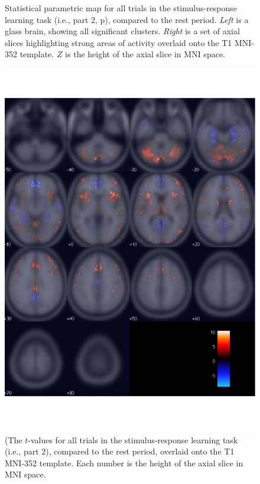 \begin{figure}[tp]
    \centering
    \caption{Statistical parametric map for all trials in the stimulus-response learning task (i.e., part 2, p\pageref{subsub:whatwhen}), compared to the rest period.  \emph{Left} is a glass brain, showing all significant clusters.  \emph{Right} is a set of axial slices highlighting strong areas of activity overlaid onto the T1 MNI-352 template.  $Z$ is the height of the axial slice in MNI space.}
    \label{fig:gl}
\end{figure}

\begin{figure}[tp]
    \includegraphics{f_map_gl_raw_t}
    \centering
    \caption{(The $t$-values for all trials in the stimulus-response learning task (i.e., part 2), compared to the rest period,  overlaid onto the T1 MNI-352 template.   Each number is the height of the axial slice in MNI space.}
    \label{fig:glraw}
\end{figure}


